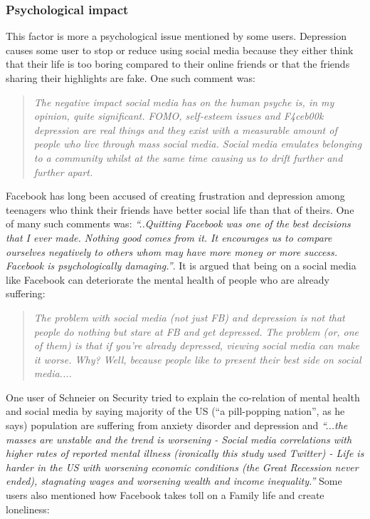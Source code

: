  \subsubsection{Psychological impact}
 This factor is more a psychological issue mentioned by some users. Depression causes some user to stop or reduce using social media because they either think that their life is too boring compared to their online friends or that the friends sharing their highlights are fake. One such comment was:
     \begin{quote}
         \textit{The negative impact social media has on the human psyche is, in my opinion, quite significant. FOMO, self-esteem issues and F4ceb00k depression are real things and they exist with a measurable amount of people who live through mass social media. Social media emulates belonging to a community whilst at the same time causing us to drift further and further apart.}
     \end{quote}
    
    Facebook has long been accused of creating frustration and depression among teenagers who think their friends have better social life than that of theirs. One of many such comments was: \textit{``..Quitting Facebook was one of the best decisions that I ever made. Nothing good comes from it. It encourages us to compare ourselves negatively to others whom may have more money or more success. Facebook is psychologically damaging.''}. It is argued that being on a social media like Facebook can deteriorate the mental health of people who are already suffering:
    \begin{quote}
         \textit{The problem with social media (not just FB) and depression is not that people do nothing but stare at FB and get depressed. The problem (or, one of them) is that if you're already depressed, viewing social media can make it worse. Why? Well, because people like to present their best side on social media.... }
    \end{quote}
    
    One user of Schneier on Security tried to explain the co-relation of mental health and social media by saying majority of the US (``a pill-popping nation'', as he says) population are suffering from anxiety disorder and depression and \textit{``...the masses are unstable and the trend is worsening - Social media correlations with higher rates of reported mental illness (ironically this study used Twitter) - Life is harder in the US with worsening economic conditions (the Great Recession never ended), stagnating wages and worsening wealth and income inequality.''} Some users also mentioned how Facebook takes toll on a Family life and create loneliness:
    
